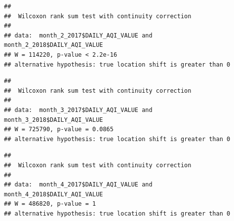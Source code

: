 \documentclass[12pt,]{article}
\newenvironment{Shaded}{\begin{snugshade}}{\end{snugshade}}
\newcommand{\KeywordTok}[1]{\textcolor[rgb]{0.13,0.29,0.53}{\textbf{#1}}}
\newcommand{\DataTypeTok}[1]{\textcolor[rgb]{0.13,0.29,0.53}{#1}}
\newcommand{\DecValTok}[1]{\textcolor[rgb]{0.00,0.00,0.81}{#1}}
\newcommand{\StringTok}[1]{\textcolor[rgb]{0.31,0.60,0.02}{#1}}
\newcommand{\OperatorTok}[1]{\textcolor[rgb]{0.81,0.36,0.00}{\textbf{#1}}}
\newcommand{\NormalTok}[1]{#1}
\begin{document}
\begin{Shaded}
\end{Shaded}

\begin{verbatim}
## 
##  Wilcoxon rank sum test with continuity correction
## 
## data:  month_2_2017$DAILY_AQI_VALUE and month_2_2018$DAILY_AQI_VALUE
## W = 114220, p-value < 2.2e-16
## alternative hypothesis: true location shift is greater than 0
\end{verbatim}

\begin{Shaded}
\end{Shaded}

\begin{verbatim}
## 
##  Wilcoxon rank sum test with continuity correction
## 
## data:  month_3_2017$DAILY_AQI_VALUE and month_3_2018$DAILY_AQI_VALUE
## W = 725790, p-value = 0.0865
## alternative hypothesis: true location shift is greater than 0
\end{verbatim}

\begin{Shaded}
\end{Shaded}

\begin{verbatim}
## 
##  Wilcoxon rank sum test with continuity correction
## 
## data:  month_4_2017$DAILY_AQI_VALUE and month_4_2018$DAILY_AQI_VALUE
## W = 486820, p-value = 1
## alternative hypothesis: true location shift is greater than 0
\end{verbatim}
\end{document}
